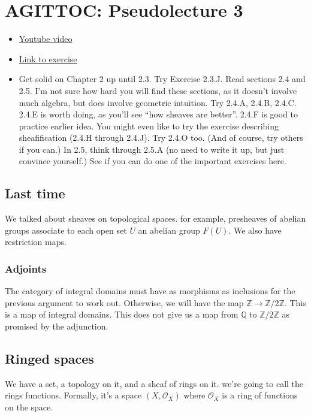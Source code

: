 \documentclass{book}
\renewcommand{\O}{\ensuremath{\mathcal{O}}}
\theoremstyle{definition}
\begin{document}
\chapter{AGITTOC: Pseudolecture 3}
\begin{itemize}
\item \href{https://www.youtube.com/watch?v=E5HnqUHkvGA}{Youtube video}
\item \href{https://math216.wordpress.com/2020/07/13/reading-and-problems-after-the-third-pseudolecture/}{Link to exercise}
\item Get solid on Chapter 2 up until 2.3. Try Exercise 2.3.J. Read
    sections 2.4 and 2.5. I’m not sure how hard you will find these
    sections, as it doesn’t involve much algebra, but does involve
    geometric intuition. Try 2.4.A, 2.4.B, 2.4.C. 2.4.E is worth doing, as
    you’ll see “how sheaves are better”. 2.4.F is good to practice earlier
    idea. You might even like to try the exercise describing sheafification
    (2.4.H through 2.4.J). Try 2.4.O too. (And of course, try others if you
    can.) In 2.5, think through 2.5.A (no need to write it up, but just
    convince yourself.) See if you can do one of the important exercises
    here.
\end{itemize}

\section{Last time}
We talked about sheaves on topological spaces. for example, presheaves of abelian
groups associate to each open set $U$ an abelian group  $F(U)$. We also
have restriction maps.

\subsection{Adjoints}
The category of integral domains must have as morphisms as inclusions for
the previous argument to work out. Otherwise, we will have the map
$\mathbb Z \rightarrow \mathbb Z / 2 \mathbb Z$. This is a map of integral domains.
This does not give us a map from $\mathbb Q$ to $\mathbb Z/2\mathbb Z$ as promised
by the adjunction.

\section{Ringed spaces}

We have a set, a topology on it, and a sheaf of rings on it. we're going
to call the rings functions. Formally, it's a space $(X, \O_X)$ where $\O_X$
is a ring of functions on the space.
\end{document}
